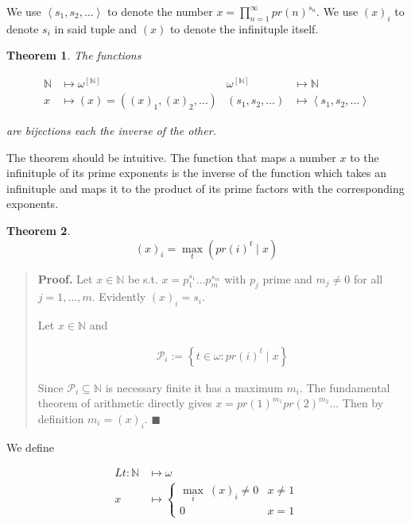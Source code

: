 \documentclass[a4paper, 12pt]{article}
\newtheorem{theorem}{Theorem}
\newtheorem{theorem}{Theorem}
\begin{document}
We use $\left\langle  s_1, s_2, \ldots  \right\rangle$ to denote the number $x =
\prod_{n=1}^{\infty} pr(n)^{s_n}$. We use $(x)_i$ to denote $s_i$ in said tuple
and $(x)$ to denote the infinituple itself.

\begin{theorem}
    The functions 

    \begin{align*}
        \mathbb{N} &\mapsto \omega^{[\mathbb{N}]} &
        \omega^{[\mathbb{N}]}&\mapsto \mathbb{N} \\  
        x &\mapsto (x) = \left( (x)_1, (x)_2, \ldots \right) & (s_1, s_2,
        \ldots)&\mapsto \left\langle  s_1, s_2,\ldots  \right\rangle
    \end{align*}

    are bijections each the inverse of the other.
\end{theorem}

The theorem should be intuitive. The function that maps a number $x$ to the
infinituple of its prime exponents is the inverse of the function which takes an
infinituple and maps it to the product of its prime factors with the
corresponding exponents.

\begin{theorem}
    $$(x)_i = \max_{t} \left( pr(i)^{t} \mid x \right) $$
\end{theorem}


\small
\begin{quote}

    \textbf{Proof.} Let $x \in \mathbb{N}$ be s.t. $x = p_1^{s_1} \ldots
    p_m^{s_m}$ with $p_j$
prime and $m_j \neq 0$ for all $j = 1, \ldots, m$. Evidently $(x)_i = s_i$. 

Let $x \in \mathbb{N}$ and

\begin{align*}
    \mathscr{P}_i  := \left\{ t \in \omega : pr(i)^t \mid x \right\} 
\end{align*}

Since $\mathscr{P}_i \subseteq \mathbb{N}$ is necessary finite it has a maximum $
m_i$. The fundamental theorem of arithmetic directly gives $x = pr(1)^{m_1}
pr(2)^{m_2} \ldots$ Then by definition $m_i = (x)_i$. $\blacksquare$


\end{quote}
\normalsize


We define 

\begin{align*}
    Lt : \mathbb{N} &\mapsto \omega \\ 
    x &\mapsto \begin{cases}
        \max_{i} ~ (x)_i \neq 0 & x \neq 1 \\ 
        0 & x = 1
    \end{cases}
\end{align*}
\end{document}
